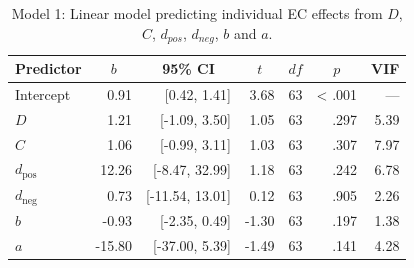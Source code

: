\documentclass[
  man,floatsintext]{apa6}
\begin{document}
\begin{table}[tbp]

\begin{center}
\begin{threeparttable}

\caption{\label{tab:unnamed-chunk-22}Model 1: Linear model predicting individual EC effects from $D$, $C$, $d_{pos}$, $d_{neg}$, $b$ and $a$.}

\begin{tabular}{lrrrrrr}
\toprule
Predictor & \multicolumn{1}{c}{$b$} & \multicolumn{1}{c}{95\% CI} & \multicolumn{1}{c}{$t$} & \multicolumn{1}{c}{$\mathit{df}$} & \multicolumn{1}{c}{$p$} & \multicolumn{1}{c}{VIF}\\
\midrule
Intercept & 0.91 & {}[0.42, 1.41] & 3.68 & 63 & < .001 & ---\\
$D$ & 1.21 & {}[-1.09, 3.50] & 1.05 & 63 & .297 & 5.39\\
$C$ & 1.06 & {}[-0.99, 3.11] & 1.03 & 63 & .307 & 7.97\\
$d_{\mathrm{pos}}$ & 12.26 & {}[-8.47, 32.99] & 1.18 & 63 & .242 & 6.78\\
$d_{\mathrm{neg}}$ & 0.73 & {}[-11.54, 13.01] & 0.12 & 63 & .905 & 2.26\\
$b$ & -0.93 & {}[-2.35, 0.49] & -1.30 & 63 & .197 & 1.38\\
$a$ & -15.80 & {}[-37.00, 5.39] & -1.49 & 63 & .141 & 4.28\\
\bottomrule
\end{tabular}

\end{threeparttable}
\end{center}

\end{table}
\end{document}

